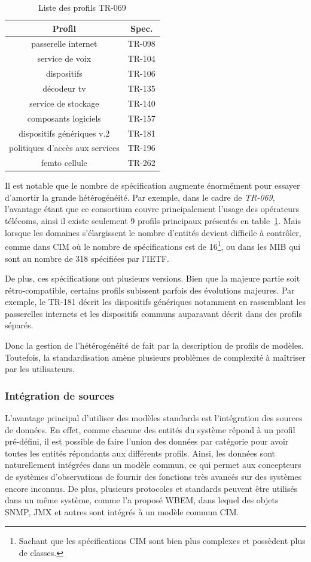\begin{table}
\centering
{\scriptsize
\begin{tabular}{cc}
\toprule
Profil & Spec. \\ \toprule
passerelle internet & TR-098 \\ \midrule
service de voix & TR-104 \\ \midrule
dispositifs & TR-106 \\ \midrule
décodeur tv & TR-135 \\ \midrule
service de stockage & TR-140 \\ \midrule
composants logiciels & TR-157 \\ \midrule
dispositifs génériques v.2 & TR-181 \\  \midrule
politiques d'accès aux services &  TR-196 \\ \midrule
femto cellule & TR-262 \\ \bottomrule
\end{tabular}}
\caption{Liste  des profils TR-069}\label{tab:rw:supervision:tr069dm}
\end{table}
Il est notable que le nombre de spécification augmente énormément pour essayer d'amortir la grande hétérogénéité. Par exemple, dans le cadre de \textit{TR-069}, l'avantage étant que ce consortium couvre principalement l'usage des opérateurs télécoms, ainsi il existe seulement 9 profils principaux présentés en table~\ref{tab:rw:supervision:tr069dm}. Mais lorsque les domaines s'élargissent le nombre d'entités devient difficile à contrôler, comme dans CIM où le nombre de spécifications est de 16\footnote{Sachant que les spécifications CIM sont bien plus complexes et possèdent plus de classes.}, ou dans les MIB qui sont au nombre de 318 spécifiées par l'IETF.

De plus, ces spécifications ont plusieurs versions. Bien que la majeure partie soit rétro-compatible, certains profils subissent parfois des évolutions majeures. Par exemple, le TR-181 décrit les dispositifs génériques notamment en rassemblant les passerelles internets et les dispositifs communs auparavant décrit dans des profils séparés. 

Donc la gestion de l'hétérogénéité de fait par la description de profils de modèles. Toutefois, la standardisation amène plusieurs problèmes de complexité à maîtriser par les utilisateurs.

\subsubsection{Intégration de sources}
L'avantage principal d'utiliser des modèles standards est l'intégration des sources de données. En effet, comme chacune des entités du système répond à un profil pré-défini, il est possible de faire l'union des données par catégorie pour avoir toutes les entités répondants aux différents profils. Ainsi, les données sont naturellement intégrées dans un modèle commun, ce qui permet aux concepteurs de systèmes d'observations de fournir des fonctions très avancés sur des systèmes encore inconnus. De plus, plusieurs protocoles et standards peuvent être utilisés dans un même système, comme l'a proposé WBEM, dans lequel des objets SNMP, JMX et autres sont intégrés à un modèle commun CIM.

